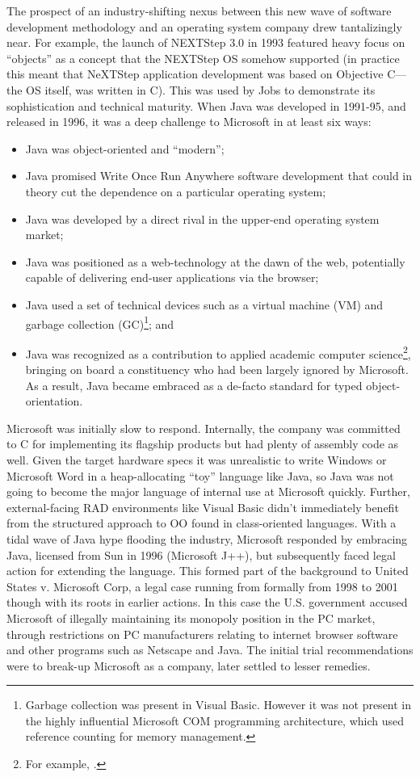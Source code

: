\documentclass[acmsmall]{acmart}\settopmatter{}
\begin{document}
The prospect of an industry-shifting nexus between this new wave of software development methodology and an
operating system company drew tantalizingly near. For example, the launch of NEXTStep 3.0 in 1993 featured heavy
focus on “objects” as a concept that the NEXTStep OS somehow supported (in practice this meant that NeXTStep application
development was based on Objective C---the OS itself, was written in C). This was used by Jobs to demonstrate its
sophistication and technical maturity. When Java was developed in 1991-95, and released in 1996, it was a deep challenge to Microsoft in at least six ways: 
\begin{itemize}
\item Java was object-oriented and “modern”;
\item Java promised Write Once Run Anywhere software development that could in theory cut the dependence on a particular operating system; 
\item Java was developed by a direct rival in the upper-end operating system market; 
\item Java was positioned as a web-technology at the dawn of the web, potentially capable of delivering end-user applications via the browser;
\item Java used a set of technical devices such as a virtual machine (VM) and garbage collection (GC)\footnote{ Garbage collection was present in Visual Basic. However it was not present in the highly influential Microsoft COM programming architecture, which used reference counting for memory management.};  and 
\item Java was recognized as a contribution to applied academic computer science\footnote{For example, \citep{alvesfoss99}.}, bringing on board a constituency who had been largely ignored by Microsoft. As a result, Java became embraced as a de-facto standard for typed object-orientation.
\end{itemize}

Microsoft was initially slow to respond.  Internally, the company was committed to C for implementing its
flagship products but had plenty of assembly code as well. Given the target hardware specs it was unrealistic to write
Windows or Microsoft Word in a heap-allocating “toy” language like Java, so Java was not going to become the major
language of internal use at Microsoft quickly. Further, external-facing RAD environments like Visual Basic didn’t immediately
benefit from the structured approach to OO found in class-oriented languages. With a tidal wave of Java hype flooding
the industry, Microsoft responded by embracing Java, licensed from Sun in 1996 (Microsoft J++), but subsequently faced
legal action for extending the language. This formed part of the background to United States v. Microsoft Corp, a legal case
running from formally from 1998 to 2001 though with its roots in earlier actions. In this case the U.S. government accused
Microsoft of illegally maintaining its monopoly position in the PC market, through restrictions on PC manufacturers relating to
internet browser software and other programs such as Netscape and Java. The initial trial recommendations were to break-up Microsoft as a company, later settled to lesser remedies. 
\end{document}
